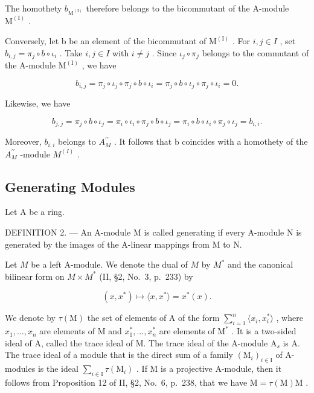 The homothety \(b_{\mathrm{M}^{(\mathrm{I})}}\) therefore belongs to the bicommutant of the A-module \(\mathrm{M}^{(\mathrm{I})}\) .

Conversely, let b be an element of the bicommutant of \(\mathrm{M}^{(\mathrm{I})}\) . For \(i,j\in I\) , set \(b_{i,j}=\pi_{j}\circ b\circ\iota_{i}\) . Take \(i,j\in I\) with \(i\neq j\) . Since \(\iota_{j}\circ\pi_{j}\) belongs to the commutant of the A-module \(\mathrm{M}^{(\mathrm{I})}\) , we have

\[
b _ {i, j} = \pi_ {j} \circ \iota_ {j} \circ \pi_ {j} \circ b \circ \iota_ {i} = \pi_ {j} \circ b \circ \iota_ {j} \circ \pi_ {j} \circ \iota_ {i} = 0.
\]

Likewise, we have

\[
b _ {j, j} = \pi_ {j} \circ b \circ \iota_ {j} = \pi_ {i} \circ \iota_ {i} \circ \pi_ {j} \circ b \circ \iota_ {j} = \pi_ {i} \circ b \circ \iota_ {i} \circ \pi_ {j} \circ \iota_ {j} = b _ {i, i}.
\]

Moreover, \(b_{i,i}\) belongs to \(A_{M}^{\prime\prime}\) . It follows that b coincides with a homothety of the \(A_{M}^{\prime\prime}\) -module \(M^{(I)}\) .

\subsection{Generating Modules}

Let \(\mathrm{A}\) be a ring.

DEFINITION 2. --- An A-module M is called generating if every A-module N is generated by the images of the A-linear mappings from M to N.

Let \(M\) be a left A-module. We denote the dual of \(M\) by \(M^*\) and the canonical bilinear form on \(M \times M^*\) (II, §2, No.~3, p.~233) by

\[
(x, x ^ {*}) \mapsto \langle x, x ^ {*} \rangle = x ^ {*} (x).
\]

We denote by \(\tau(\mathrm{M})\) the set of elements of A of the form \(\sum_{i=1}^{n}\langle x_i,x_i^*\rangle\) , where \(x_1,\ldots ,x_n\) are elements of M and \(x_1^*,\ldots ,x_n^*\) are elements of \(\mathrm{M}^*\) . It is a two-sided ideal of A, called the trace ideal of M. The trace ideal of the A-module \(\mathrm{A}_s\) is A. The trace ideal of a module that is the direct sum of a family \((\mathrm{M}_i)_{i\in \mathrm{I}}\) of A-modules is the ideal \(\sum_{i\in \mathrm{I}}\tau(\mathrm{M}_i)\) . If M is a projective A-module, then it follows from Proposition 12 of II, §2, No.~6, p.~238, that we have \(\mathrm{M} = \tau(\mathrm{M})\mathrm{M}\) .

